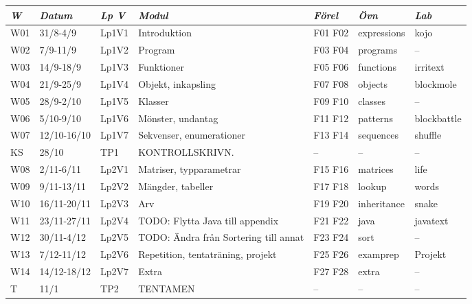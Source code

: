 \begin{tabular}{l|l|l|l|l|l|l}
\textit{W} & \textit{Datum} & \textit{Lp V} & \textit{Modul} & \textit{Förel} & \textit{Övn} & \textit{Lab} \\ \hline \hline
W01 & 31/8-4/9 & Lp1V1 & Introduktion & F01 F02 & expressions & kojo \\
W02 & 7/9-11/9 & Lp1V2 & Program & F03 F04 & programs & -- \\
W03 & 14/9-18/9 & Lp1V3 & Funktioner & F05 F06 & functions & irritext \\
W04 & 21/9-25/9 & Lp1V4 & Objekt, inkapsling & F07 F08 & objects & blockmole \\
W05 & 28/9-2/10 & Lp1V5 & Klasser & F09 F10 & classes & -- \\
W06 & 5/10-9/10 & Lp1V6 & Mönster, undantag & F11 F12 & patterns & blockbattle \\
W07 & 12/10-16/10 & Lp1V7 & Sekvenser, enumerationer & F13 F14 & sequences & shuffle \\
KS & 28/10 & TP1 & KONTROLLSKRIVN. & -- & -- & -- \\
W08 & 2/11-6/11 & Lp2V1 & Matriser, typparametrar & F15 F16 & matrices & life \\
W09 & 9/11-13/11 & Lp2V2 & Mängder, tabeller & F17 F18 & lookup & words \\
W10 & 16/11-20/11 & Lp2V3 & Arv & F19 F20 & inheritance & snake \\
W11 & 23/11-27/11 & Lp2V4 & TODO: Flytta Java till appendix & F21 F22 & java & javatext \\
W12 & 30/11-4/12 & Lp2V5 & TODO: Ändra från Sortering till annat & F23 F24 & sort & -- \\
W13 & 7/12-11/12 & Lp2V6 & Repetition, tentaträning, projekt & F25 F26 & examprep & Projekt \\
W14 & 14/12-18/12 & Lp2V7 & Extra & F27 F28 & extra & -- \\
T & 11/1 & TP2 & TENTAMEN & -- & -- & -- \\
\end{tabular}
